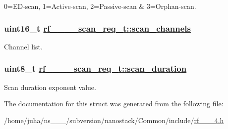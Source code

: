 0=ED-scan, 1=Active-scan, 2=Passive-scan \& 3=Orphan-scan. \hypertarget{structrf__802__15__4__scan__req__t_8fe91abc47377e746610fdfc77fe32c4}{
\subsubsection[scan\_\-channels]{\setlength{\rightskip}{0pt plus 5cm}uint16\_\-t \hyperlink{structrf__802__15__4__scan__req__t_8fe91abc47377e746610fdfc77fe32c4}{rf\_\_\_\_\-scan\_\-req\_\-t::scan\_\-channels}}}
\label{structrf__802__15__4__scan__req__t_8fe91abc47377e746610fdfc77fe32c4}


Channel list. \hypertarget{structrf__802__15__4__scan__req__t_7ece7fa7b4a28db1ba5b3375ab820f82}{
\subsubsection[scan\_\-duration]{\setlength{\rightskip}{0pt plus 5cm}uint8\_\-t \hyperlink{structrf__802__15__4__scan__req__t_7ece7fa7b4a28db1ba5b3375ab820f82}{rf\_\_\_\_\-scan\_\-req\_\-t::scan\_\-duration}}}
\label{structrf__802__15__4__scan__req__t_7ece7fa7b4a28db1ba5b3375ab820f82}


Scan duration exponent value. 

The documentation for this struct was generated from the following file:\begin{CompactItemize}
\item 
/home/juha/ns\_\_\_/subversion/nanostack/Common/include/\hyperlink{rf__802__15__4_8h}{rf\_\_\_\-4.h}\end{CompactItemize}
